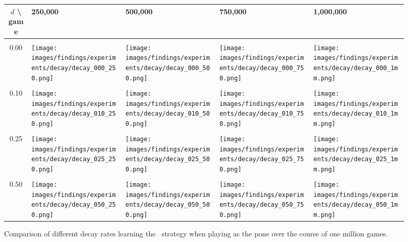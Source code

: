 \begin{figure}[h]
	\centering

	\begin{tabular}{c | l l l l}
		$d$ \textbf{\textbackslash} game & 250,000 & 500,000 & 750,000 & 1,000,000 \\
		\hline
		\\
		0.00 &
			\parbox[c]{5em}{\texttt{[image: images/findings/experiments/decay/decay\_000\_250.png]}} & %
			\parbox[c]{5em}{\texttt{[image: images/findings/experiments/decay/decay\_000\_500.png]}} & %
			\parbox[c]{5em}{\texttt{[image: images/findings/experiments/decay/decay\_000\_750.png]}} & %
			\parbox[c]{5em}{\texttt{[image: images/findings/experiments/decay/decay\_000\_1mm.png]}} \\ %
		\\
		0.10 & 
			\parbox[c]{5em}{\texttt{[image: images/findings/experiments/decay/decay\_010\_250.png]}} & %
			\parbox[c]{5em}{\texttt{[image: images/findings/experiments/decay/decay\_010\_500.png]}} & %
			\parbox[c]{5em}{\texttt{[image: images/findings/experiments/decay/decay\_010\_750.png]}} & %
			\parbox[c]{5em}{\texttt{[image: images/findings/experiments/decay/decay\_010\_1mm.png]}} \\ %
		\\
		0.25 & 
			\parbox[c]{5em}{\texttt{[image: images/findings/experiments/decay/decay\_025\_250.png]}} & %
			\parbox[c]{5em}{\texttt{[image: images/findings/experiments/decay/decay\_025\_500.png]}} & %
			\parbox[c]{5em}{\texttt{[image: images/findings/experiments/decay/decay\_025\_750.png]}} & %
			\parbox[c]{5em}{\texttt{[image: images/findings/experiments/decay/decay\_025\_1mm.png]}} \\ %
		\\
		0.50 & 
			\parbox[c]{5em}{\texttt{[image: images/findings/experiments/decay/decay\_050\_250.png]}} & %
			\parbox[c]{5em}{\texttt{[image: images/findings/experiments/decay/decay\_050\_500.png]}} & %
			\parbox[c]{5em}{\texttt{[image: images/findings/experiments/decay/decay\_050\_750.png]}} & %
			\parbox[c]{5em}{\texttt{[image: images/findings/experiments/decay/decay\_050\_1mm.png]}} \\ %
	\end{tabular}

\caption{
	Comparison of different decay rates learning the \handmaxavg\ strategy
	when playing as the pone
	over the course of one million games.
	}
\label{fig:expts-decay-comp}
\end{figure}
